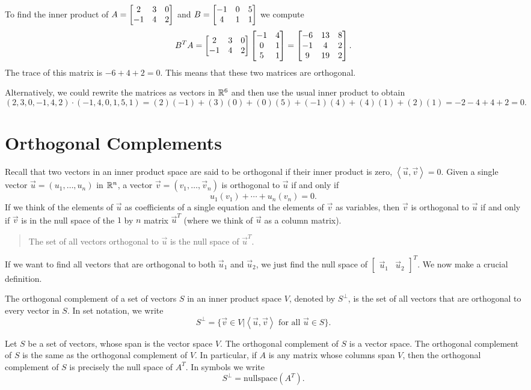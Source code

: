 \begin{example}
To find the inner product of $A=\begin{bmatrix} 2&3&0\\-1&4&2 \end{bmatrix}$ and $B=\begin{bmatrix} -1&0&5\\4&1&1 \end{bmatrix}$ we compute 
$$B^TA = \begin{bmatrix} 2&3&0\\-1&4&2 \end{bmatrix}\begin{bmatrix}  -1 & 4 \\ 0 & 1 \\ 5 & 1 \end{bmatrix}= \begin{bmatrix}  -6 & 13 & 8 \\ -1 & 4 & 2 \\ 9 & 19 & 2 \end{bmatrix}.$$
The trace of this matrix is $-6 +4 +2 = 0$. This means that these two matrices are orthogonal.

Alternatively, we could rewrite the matrices as vectors in $\mathbb{R}^6$ and then use the usual inner product to obtain $$(2,3,0,-1,4,2)\cdot (-1,4,0,1,5,1) = (2)(-1)+(3)(0)+(0)(5)+(-1)(4)+(4)(1)+(2)(1)= -2-4+4+2 =0.$$
\end{example}






\section{Orthogonal Complements}
Recall that two vectors in an inner product space are said to be orthogonal if their inner product is zero, $\left<\vec u,\vec v\right>=0$.  
Given a single vector $\vec u = (u_1,\ldots,u_n)$ in $\mathbb{R}^n$, a vector $\vec v = (v_1,\ldots,\vec v_n)$ is orthogonal to $\vec u$ if and only if $$u_1(v_1)+\cdots +u_n(v_n)=0.$$ 
If we think of the elements of $\vec u$ as coefficients of a single equation and the elements of $\vec v$ as variables, 
then $\vec v$ is orthogonal to $\vec u$ if and only if $\vec v$ is in the null space of the $1$ by $n$ matrix $\vec u^T$ (where we think of $\vec u$ as a column matrix). 
\begin{quote}
The set of all vectors orthogonal to $\vec u$ is the null space of $\vec u^T$. 
\end{quote}
If we want to find all vectors that are orthogonal to both $\vec u_1$ and $\vec u_2$, we just find the null space of $\begin{bmatrix}\vec u_1&\vec u_2\end{bmatrix}^T$. We now make a crucial definition.

\begin{definition}
The orthogonal complement of a set of vectors $S$ in an inner product space $V$, denoted by $S^\perp$, is the set of all vectors that are orthogonal to every vector in $S$. 
In set notation, we write  
$$S^\perp = \{\vec v\in V | \left<\vec u, \vec v\right> \text{ for all }\vec u\in S\}.$$
\end{definition}
\begin{theorem}
Let $S$ be a set of vectors, whose span is the vector space $V$.  
The orthogonal complement of $S$ is a vector space.
The orthogonal complement of $S$ is the same as the orthogonal complement of $V$.
In particular, if $A$ is any matrix whose columns span $V$, then the orthogonal complement of $S$ is precisely the null space of $A^T$. In symbols we write $$S^\perp = \text{nullspace}(A^T).$$   
\end{theorem}

